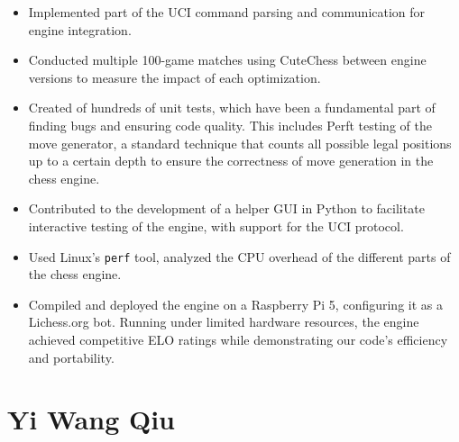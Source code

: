 \begin{itemize}
    \item Implemented part of the UCI command parsing and communication for engine integration.

    \item Conducted multiple 100-game matches using CuteChess between engine versions to measure the impact of each optimization.

    \item Created of hundreds of unit tests, which have been a fundamental part of finding bugs and ensuring code quality. This includes Perft testing of the move generator, a standard technique that counts all possible legal positions up to a certain depth to ensure the correctness of move generation in the chess engine.

    \item Contributed to the development of a helper GUI in Python to facilitate interactive testing of the engine, with support for the UCI protocol.    

    \item Used Linux's \texttt{perf} tool, analyzed the CPU overhead of the different parts of the chess engine.

    \item Compiled and deployed the engine on a Raspberry Pi 5, configuring it as a Lichess.org bot.  Running under limited hardware resources, the engine achieved competitive ELO ratings while demonstrating our code's efficiency and portability.

\end{itemize}

\section*{Yi Wang Qiu}

